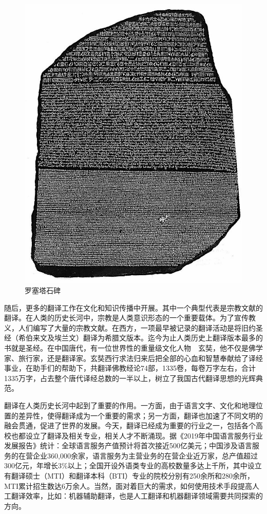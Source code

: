 \begin{figure}[htp]
    \centering
\includegraphics[scale=0.20]{./Chapter1/Figures/figure-rosetta-stone.jpg}
    \caption{罗塞塔石碑}
    \label{fig:1-3}
\end{figure}

\parinterval 随后，更多的翻译工作在文化和知识传播中开展。其中一个典型代表是宗教文献的翻译。在人类的历史长河中，宗教是人类意识形态的一个重要载体。为了宣传教义，人们编写了大量的宗教文献。在西方，一项最早被记录的翻译活动是将旧约圣经（希伯来文及埃兰文）翻译为希腊文版本。迄今为止人类历史上翻译版本最多的书就是圣经。在中国唐代，有一位世界性的重量级文化人物\ \dash \ 玄奘，他不仅是佛学家、旅行家，还是翻译家。玄奘西行求法归来后把全部的心血和智慧奉献给了译经事业，在助手们的帮助下，共翻译佛教经论74部，1335卷，每卷万字左右，合计1335万字，占去整个唐代译经总数的一半以上，树立了我国古代翻译思想的光辉典范。

\parinterval 翻译在人类历史长河中起到了重要的作用。一方面，由于语言文字、文化和地理位置的差异性，使得翻译成为一个重要的需求；另一方面，翻译也加速了不同文明的融会贯通，促进了世界的发展。今天，翻译已经成为重要的行业之一，包括各个高校也都设立了翻译及相关专业，相关人才不断涌现。据《2019年中国语言服务行业发展报告》统计：全球语言服务产值预计将首次接近500亿美元；中国涉及语言服务的在营企业360,000余家，语言服务为主营业务的在营企业近万家，总产值超过300亿元，年增长3\%以上；全国开设外语类专业的高校数量多达上千所，其中设立有翻译硕士（MTI）和翻译本科（BTI）专业的院校分别有250余所和280余所，MTI累计招生数达6万余人\cite{赵军峰2019深化改革}。当然，面对着巨大的需求，如何使用技术手段提高人工翻译效率，比如：机器辅助翻译，也是人工翻译和机器翻译领域需要共同探索的方向。

